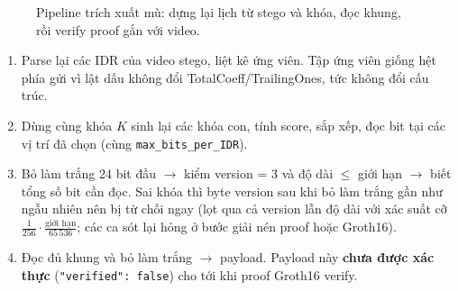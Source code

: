 \documentclass[11pt,a4paper]{article}
\begin{document}
\begin{figure}[H]
\centering
{}
\caption{Pipeline trích xuất mù: dựng lại lịch từ stego và khóa, đọc khung, rồi verify proof gắn với video.}
\label{fig:extract}
\end{figure}

\begin{enumerate}[leftmargin=*]
  \item Parse lại các IDR của video stego, liệt kê ứng viên. Tập ứng viên giống hệt
  phía gửi vì lật dấu không đổi TotalCoeff/TrailingOnes, tức không đổi cấu trúc.
  \item Dùng cùng khóa \(K\) sinh lại các khóa con, tính score, sắp xếp, đọc bit tại
  các vị trí đã chọn (cùng \texttt{max\_bits\_per\_IDR}).
  \item Bỏ làm trắng 24 bit đầu \(\rightarrow\) kiểm version = 3 và độ dài
  \(\le\) giới hạn \(\rightarrow\) biết tổng số bit cần đọc. Sai khóa thì byte version
  sau khi bỏ làm trắng gần như ngẫu nhiên nên bị từ chối ngay (lọt qua cả version lẫn
  độ dài với xác suất cỡ \(\tfrac{1}{256} \cdot \tfrac{\text{giới hạn}}{65\,536}\); các
  ca sót lại hỏng ở bước giải nén proof hoặc Groth16).
  \item Đọc đủ khung và bỏ làm trắng \(\rightarrow\) payload. Payload này \textbf{chưa
  được xác thực} (\texttt{"verified": false}) cho tới khi proof Groth16 verify.
\end{enumerate}
\end{document}
